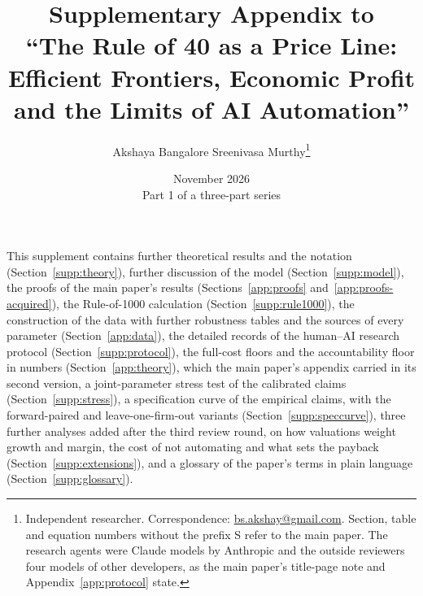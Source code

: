 \documentclass[11pt]{article}
\title{Supplementary Appendix to\\ ``The Rule of 40 as a Price Line:\\ Efficient Frontiers, Economic Profit and the Limits of AI Automation''}
\author{Akshaya Bangalore Sreenivasa Murthy\thanks{Independent researcher. Correspondence: \href{mailto:bs.akshay@gmail.com}{bs.akshay@gmail.com}. Section, table and equation numbers without the prefix S refer to the main paper. The research agents were Claude models by Anthropic and the outside reviewers four models of other developers, as the main paper's title-page note and Appendix~\ref{app:protocol} state. \PoneRights}}
\date{November 2026\\[2pt] {\small Part 1 of a three-part series}}
\begin{document}
\maketitle
\small{}
\noindent This supplement contains further theoretical results and the notation (Section~\ref{supp:theory}), further discussion of the model (Section~\ref{supp:model}), the proofs of the main paper's results (Sections~\ref{app:proofs} and~\ref{app:proofs-acquired}), the Rule-of-1000 calculation (Section~\ref{supp:rule1000}), the construction of the data with further robustness tables and the sources of every parameter (Section~\ref{app:data}), the detailed records of the human--AI research protocol (Section~\ref{supp:protocol}), the full-cost floors and the accountability floor in numbers (Section~\ref{app:theory}), which the main paper's appendix carried in its second version, a joint-parameter stress test of the calibrated claims (Section~\ref{supp:stress}), a specification curve of the empirical claims, with the forward-paired and leave-one-firm-out variants (Section~\ref{supp:speccurve}), three further analyses added after the third review round, on how valuations weight growth and margin, the cost of not automating and what sets the payback (Section~\ref{supp:extensions}), and a glossary of the paper's terms in plain language (Section~\ref{supp:glossary}).













{\footnotesize{}
\setlength{\bibsep}{1pt plus 1pt}


}
\end{document}
